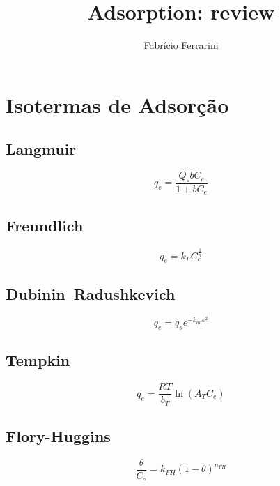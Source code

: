\documentclass[3p]{elsarticle}
\begin{document}
\begin{frontmatter} 
\title{Adsorption: review}
\author{Fabr\'icio Ferrarini}
 


\address{Departamento de Engenharia Qu\'imica, Escola de 
Engenharia, Universidade Federal do Rio Grande do Sul,
Rua Engenheiro Luis Englert, s/n, Bairro Farroupilha, CEP 90040-040, Porto
Alegre, RS, Brazil\\July 2013}


\end{frontmatter}

\section{Isotermas de Adsorção}

\subsection{Langmuir}
\begin{equation}
q_e = \frac{Q_{\circ}bC_e}{1+bC_e}
\end{equation}
\cite{Langmuir1916}

\subsection{Freundlich}
\begin{equation}
q_e = k_FC_e^{\frac{1}{n}}
\end{equation}
\cite{Freundlich1906}

\subsection{Dubinin–Radushkevich}
\begin{equation}
q_e = q_se^{-k_{ad}\varepsilon^2}
\end{equation}
\cite{Dubinin1947}

\subsection{Tempkin}
\begin{equation}
q_e = \frac{RT}{b_T}\ln\left(A_TC_e\right)
\end{equation}
\cite{Tempkin1940}

\subsection{Flory-Huggins}
\begin{equation}
\frac{\theta}{C_{\circ}} = k_{FH}\left(1 - \theta\right)^{n_{FH}}
\end{equation}
\end{document}
